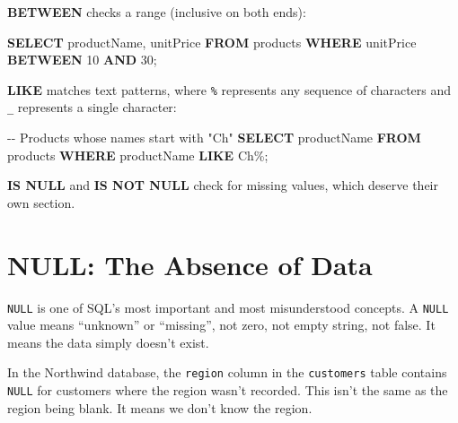 \documentclass[
  letterpaper,
  DIV=11,
  numbers=noendperiod]{scrreprt}
\newenvironment{Shaded}{\begin{snugshade}}{\end{snugshade}}
\newcommand{\CommentTok}[1]{\textcolor[rgb]{0.37,0.37,0.37}{#1}}
\newcommand{\DecValTok}[1]{\textcolor[rgb]{0.68,0.00,0.00}{#1}}
\newcommand{\KeywordTok}[1]{\textcolor[rgb]{0.00,0.23,0.31}{\textbf{#1}}}
\newcommand{\NormalTok}[1]{\textcolor[rgb]{0.00,0.23,0.31}{#1}}
\newcommand{\StringTok}[1]{\textcolor[rgb]{0.13,0.47,0.30}{#1}}
\begin{document}
\textbf{BETWEEN} checks a range (inclusive on both ends):

\begin{codelisting}

\caption{\texttt{duckdb}}

\begin{Shaded}
\begin{Highlighting}[]
\KeywordTok{SELECT}\NormalTok{ productName, unitPrice}
\KeywordTok{FROM}\NormalTok{ products}
\KeywordTok{WHERE}\NormalTok{ unitPrice }\KeywordTok{BETWEEN} \DecValTok{10} \KeywordTok{AND} \DecValTok{30}\NormalTok{;}
\end{Highlighting}
\end{Shaded}

\end{codelisting}

\textbf{LIKE} matches text patterns, where \texttt{\%} represents any
sequence of characters and \texttt{\_} represents a single character:

\begin{codelisting}

\caption{\texttt{duckdb}}

\begin{Shaded}
\begin{Highlighting}[]
\CommentTok{{-}{-} Products whose names start with "Ch"}
\KeywordTok{SELECT}\NormalTok{ productName}
\KeywordTok{FROM}\NormalTok{ products}
\KeywordTok{WHERE}\NormalTok{ productName }\KeywordTok{LIKE} \StringTok{\textquotesingle{}Ch\%\textquotesingle{}}\NormalTok{;}
\end{Highlighting}
\end{Shaded}

\end{codelisting}

\textbf{IS NULL} and \textbf{IS NOT NULL} check for missing values,
which deserve their own section.

\section{NULL: The Absence of Data}\label{null-the-absence-of-data}

\texttt{NULL} is one of SQL's most important and most misunderstood
concepts. A \texttt{NULL} value means ``unknown'' or ``missing'', not
zero, not empty string, not false. It means the data simply doesn't
exist.

In the Northwind database, the \texttt{region} column in the
\texttt{customers} table contains \texttt{NULL} for customers where the
region wasn't recorded. This isn't the same as the region being blank.
It means we don't know the region.
\end{document}
